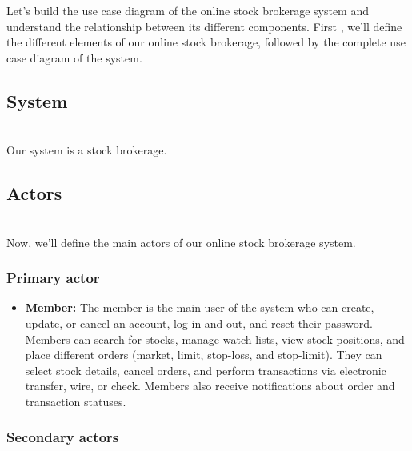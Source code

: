 

Let's build the use case diagram of the online stock brokerage system and understand the relationship between its different components. First , we'll define the different elements of our online stock brokerage, followed by the complete use case diagram of the system.

\subsection{System}\label{7g46wV3QV49d5GsTx07ms}
\\
Our system is a stock brokerage.

\subsection{Actors}\label{ah8HA3fHu_uD_qn1W7Hza}
\\
Now, we'll define the main actors of our online stock brokerage system.

\subsubsection{Primary actor}\label{vDxqW7jy1APVvWV6FSYss}

\begin{itemize}
\item
\protect{}\label{jjwLshAGqUwA-qtV8nYKD}
\textbf{Member:} The member is the main user of the system who can create, update, or cancel an account, log in and out, and reset their password. Members can search for stocks, manage watch lists, view stock positions, and place different orders (market, limit, stop-loss, and stop-limit). They can select stock details, cancel orders, and perform transactions via electronic transfer, wire, or check. Members also receive notifications about order and transaction statuses.
\end{itemize}

\subsubsection{Secondary actors}\label{RnN8mVQQ2BPn1Q1AFEVtu}

